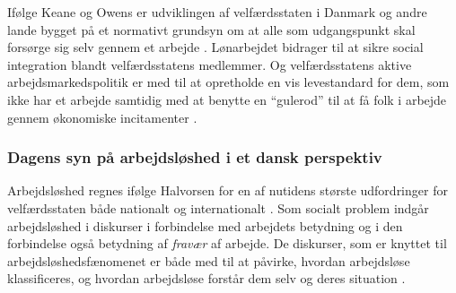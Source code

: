 Ifølge Keane og Owens er udviklingen af velfærdsstaten i Danmark og andre lande bygget på et normativt grundsyn om at alle som udgangspunkt skal forsørge sig selv gennem et arbejde \textbf{\parencite[18]{Keane1986}}. Lønarbejdet bidrager til at sikre social integration blandt velfærdsstatens medlemmer. Og velfærdsstatens aktive arbejdsmarkedspolitik er med til at opretholde en vis levestandard for dem, som ikke har et arbejde samtidig med at benytte en “gulerod” til at få folk i arbejde gennem økonomiske incitamenter \textbf{\parencite[7]{Halvorsen1999}}. %


\subsubsection{Dagens syn på arbejdsløshed i et dansk perspektiv} 

Arbejdsløshed regnes ifølge Halvorsen for en af nutidens største udfordringer for velfærdsstaten både nationalt og internationalt \textbf{\parencite[8]{Halvorsen1999}}. Som socialt problem indgår arbejdsløshed i diskurser i forbindelse med arbejdets betydning og i den forbindelse også betydning af \textit{fravær} af arbejde. De diskurser, som er knyttet til arbejdsløshedsfænomenet er både med til at påvirke, hvordan arbejdsløse klassificeres, og hvordan arbejdsløse forstår dem selv og deres situation \textbf{\parencite[12]{Halvorsen1999}}. %

